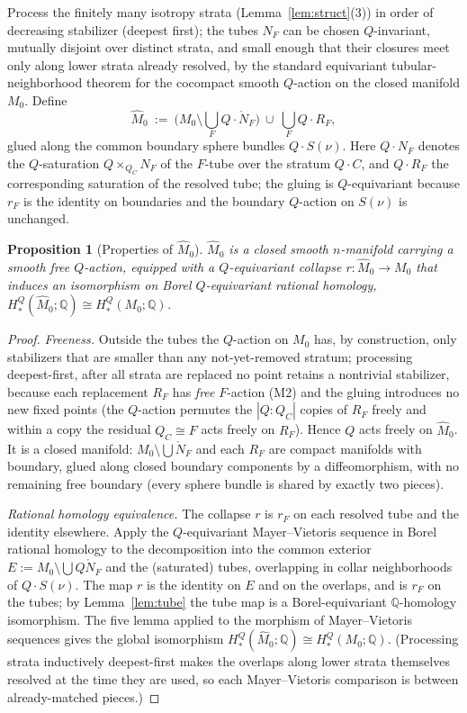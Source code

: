 \documentclass[12pt]{article}
\newtheorem{proposition}[theorem]{Proposition}
\theoremstyle{definition}
\begin{document}
Process the finitely many isotropy strata (Lemma~\ref{lem:struct}(3)) in order
of decreasing stabilizer (deepest first); the tubes $N_F$ can be chosen
$Q$-invariant, mutually disjoint over distinct strata, and small enough that
their closures meet only along lower strata already resolved, by the standard
equivariant tubular-neighborhood theorem for the cocompact smooth $Q$-action on
the closed manifold $M_0$. Define
\[
   \widehat M_0\ :=\ \Big(M_0\setminus\textstyle\bigcup_F Q\!\cdot\!\mathring N_F\Big)
   \ \cup\ \textstyle\bigcup_F Q\!\cdot\! R_F,
\]
glued along the common boundary sphere bundles $Q\cdot S(\nu)$. Here
$Q\cdot N_F$ denotes the $Q$-saturation $Q\times_{Q_C}N_F$ of the $F$-tube over
the stratum $Q\cdot C$, and $Q\cdot R_F$ the corresponding saturation of the
resolved tube; the gluing is $Q$-equivariant because $r_F$ is the identity on
boundaries and the boundary $Q$-action on $S(\nu)$ is unchanged.

\begin{proposition}[Properties of $\widehat M_0$]\label{prop:hatM}
$\widehat M_0$ is a closed smooth $n$-manifold carrying a smooth \emph{free}
$Q$-action, equipped with a $Q$-equivariant collapse
$r\colon\widehat M_0\to M_0$ that induces an isomorphism on Borel
$Q$-equivariant rational homology, $H^Q_*(\widehat M_0;\mathbb{Q})\cong
H^Q_*(M_0;\mathbb{Q})$.
\end{proposition}
\begin{proof}
\emph{Freeness.} Outside the tubes the $Q$-action on $M_0$ has, by construction,
only stabilizers that are smaller than any not-yet-removed stratum; processing
deepest-first, after all strata are replaced no point retains a nontrivial
stabilizer, because each replacement $R_F$ has \emph{free} $F$-action (M2) and
the gluing introduces no new fixed points (the $Q$-action permutes the $|Q:Q_C|$
copies of $R_F$ freely and within a copy the residual $Q_C\cong F$ acts freely on
$R_F$). Hence $Q$ acts freely on $\widehat M_0$. It is a closed manifold:
$M_0\setminus\bigcup\mathring N_F$ and each $R_F$ are compact manifolds with
boundary, glued along closed boundary components by a diffeomorphism, with no
remaining free boundary (every sphere bundle is shared by exactly two pieces).

\emph{Rational homology equivalence.} The collapse $r$ is $r_F$ on each resolved
tube and the identity elsewhere. Apply the $Q$-equivariant Mayer--Vietoris
sequence in Borel rational homology to the decomposition into the common
exterior $E:=M_0\setminus\bigcup Q\mathring N_F$ and the (saturated) tubes,
overlapping in collar neighborhoods of $Q\cdot S(\nu)$. The map $r$ is the
identity on $E$ and on the overlaps, and is $r_F$ on the tubes; by
Lemma~\ref{lem:tube} the tube map is a Borel-equivariant $\mathbb{Q}$-homology
isomorphism. The five lemma applied to the morphism of Mayer--Vietoris sequences
gives the global isomorphism $H^Q_*(\widehat M_0;\mathbb{Q})\cong
H^Q_*(M_0;\mathbb{Q})$. (Processing strata inductively deepest-first makes the
overlaps along lower strata themselves resolved at the time they are used, so
each Mayer--Vietoris comparison is between already-matched pieces.)
\end{proof}
\end{document}
